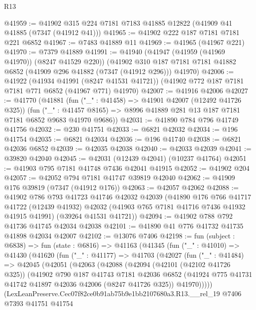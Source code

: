\begin{lexlean}{R13}
\begin{coremodule}
@41959 := @41902 @315 @224 @7181 @7183 @41885 @12822 (@41909 @41 @41885 (@7347 (@41912 @41)))
@41965 := @41902 @222 @187 @7181 @7181 @221 @6852
@41967 := @7483 @41889 @11
@41969 := @41965 (@41967 @221)
@41970 := @7379 @41889
@41991 := @41940
    (@41947 (@41959 (@41969 @41970)) (@8247 @41529 @220))
    (@41902 @310 @187 @7181 @7181 @41882 @6852 (@41909 @296 @41882 (@7347 (@41912 @296))) @41970)
@42006 := @41922
    (@41934 @41991 (@8247 @41531 @41721))
    (@41902 @772 @187 @7181 @7181 @771 @6852 (@41967 @771) @41970)
@42007 := @41916 @42006
@42027 := @41770
    (@41881
      (fun ("_" : @41458) => @41901 @42007 (@12492 @41726 @325))
      (fun ("_" : @41457 @8165) => @8996 @41889 @281 @13 @187 @7181 @7181 @6852 @9683 @41970 @9686))
@42031 := @41890 @784 @796 @41749 @41756
@42032 := @230 @41751
@42033 := @6821 @42032
@42034 := @196 @41754
@42035 := @6821 @42034
@42036 := @196 @41740
@42038 := @6821 @42036 @6852
@42039 := @42035 @42038
@42040 := @42033 @42039
@42041 := @39820 @42040
@42045 := @42031 (@12439 @42041) (@10237 @41764)
@42051 := @41903 @795 @7181 @41748 @7436 @42041 @41915
@42052 := @41902 @204
@42057 := @42052 @794 @7181 @41747 @39819 @42040
@42062 := @41909 @176 @39819 (@7347 (@41912 @176))
@42063 := @42057 @42062
@42088 := @41902
    @786
    @793
    @41723
    @41746
    @42032
    @42039
    (@41890
      @176
      @766
      @41717
      @41722
      (@12439 @41932)
      @42032
      (@41903 @765 @7181 @41716 @7436 @41932 @41915 @41991)
      (@39264 @41531 @41721))
@42094 := @41902 @788 @792 @41736 @41745 @42034 @42038
@42101 := @41890 @41 @776 @41732 @41735 @41898 @42034 @42007
@42102 := @13076 @7406
@42198 := fun (subject : @6838) =>
  fun (state : @6816) =>
  @41163
    (@41345
      (fun ("_" : @41010) =>
      @41430
        (@41620
          (fun ("_" : @41177) =>
          @41703
            (@42027
              (fun ("_" : @41484) =>
              @42045
                (@42051
                  (@42063
                    (@42088
                      (@42094
                        (@42101 (@42102 @41726 @325))
                        (@41902
                          @790
                          @187
                          @41743
                          @7181
                          @42036
                          @6852
                          (@41924 @775 @41731 @41742 @41897 @42036 @42006 (@8247 @41726 @325))
                          @41970)))))
                (LexLeanPreserve.Cec07f82ce0b91ab75b9e1bb2107680a3.R13.__rel_19
                  @7406
                  @7393
                  @41751
                  @41754

\end{coremodule}
\end{lexlean}
